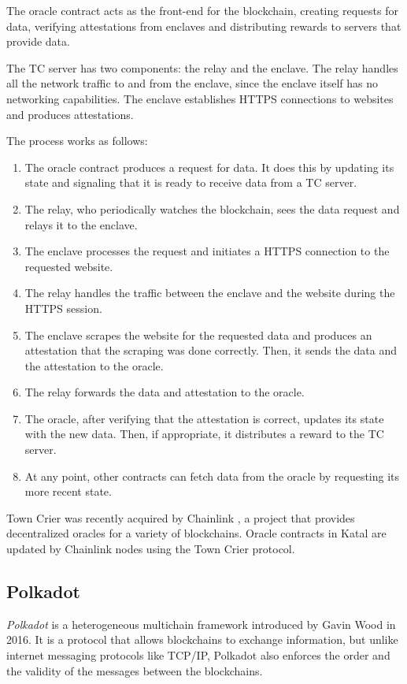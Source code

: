 \documentclass[conference]{IEEEtran}
\begin{document}
The oracle contract acts as the front-end for the blockchain, creating requests for data, verifying attestations from enclaves and distributing rewards to servers that provide data.

The TC server has two components: the relay and the enclave. The relay handles all the network traffic to and from the enclave, since the enclave itself has no networking capabilities. The enclave establishes HTTPS connections to websites and produces attestations.

The process works as follows:

\begin{enumerate}
	\item The oracle contract produces a request for data. It does this by updating its state and signaling that it is ready to receive data from a TC server.
	\item The relay, who periodically watches the blockchain, sees the data request and relays it to the enclave.
	\item The enclave processes the request and initiates a HTTPS connection to the requested website.
	\item The relay handles the traffic between the enclave and the website during the HTTPS session.
	\item The enclave scrapes the website for the requested data and produces an attestation that the scraping was done correctly. Then, it sends the data and the attestation to the oracle.
	\item The relay forwards the data and attestation to the oracle.
	\item The oracle, after verifying that the attestation is correct, updates its state with the new data. Then, if appropriate, it distributes a reward to the TC server.
	\item At any point, other contracts can fetch data from the oracle by requesting its more recent state.
\end{enumerate}

Town Crier was recently acquired by Chainlink \cite{ellis2017chainlink}, a project that provides decentralized oracles for a variety of blockchains. Oracle contracts in Katal are updated by Chainlink nodes using the Town Crier protocol.

\subsection{Polkadot}
\textit{Polkadot} \cite{wood2016polkadot} is a heterogeneous multichain framework introduced by Gavin Wood in 2016. It is a protocol that allows blockchains to exchange information, but unlike internet messaging protocols like TCP/IP, Polkadot also enforces the order and the validity of the messages between the blockchains.
\end{document}
